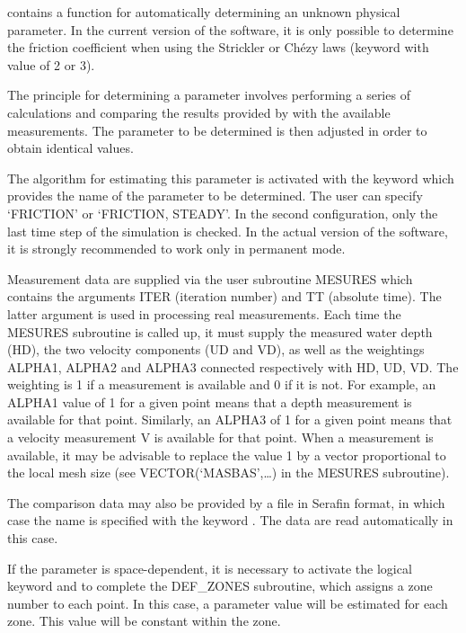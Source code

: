   contains a function for automatically determining an unknown physical parameter. In the current version of the software, it is only possible to determine the friction coefficient when using the Strickler or Ch\'{e}zy laws (keyword  with value of 2 or 3).

 The principle for determining a parameter involves performing a series of calculations and comparing the results provided by  with the available measurements. The parameter to be determined is then adjusted in order to obtain identical values.

 The algorithm for estimating this parameter is activated with the keyword  which provides the name of the parameter to be determined. The user can specify `FRICTION' or `FRICTION, STEADY'. In the second configuration, only the last time step of the simulation is checked. In the actual version of the software, it is strongly recommended to work only in permanent mode.

 Measurement data are supplied via the user subroutine MESURES which contains the arguments ITER (iteration number) and TT (absolute time). The latter argument is used in processing real measurements. Each time the MESURES subroutine is called up, it must supply the measured water depth (HD), the two velocity components (UD and VD), as well as the weightings ALPHA1, ALPHA2 and ALPHA3 connected respectively with HD, UD, VD. The weighting is 1 if a measurement is available and 0 if it is not. For example, an ALPHA1 value of 1 for a given point means that a depth measurement is available for that point. Similarly, an ALPHA3 of 1 for a given point means that a velocity measurement V is available for that point. When a measurement is available, it may be advisable to replace the value 1 by a vector proportional to the local mesh size (see VECTOR(`MASBAS',{\dots}) in the MESURES subroutine).

 The comparison data may also be provided by a file in Serafin format, in which case the name is specified with the keyword . The data are read automatically in this case.

 If the parameter is space-dependent, it is necessary to activate the logical keyword  and to complete the DEF\_ZONES subroutine, which assigns a zone number to each point. In this case, a parameter value will be estimated for each zone. This value will be constant within the zone.


